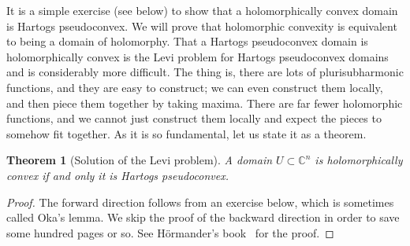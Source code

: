\documentclass[12pt,openany]{book}
\newcommand{\C}{{\mathbb{C}}}
\theoremstyle{plain}
\newtheorem{thm}{Theorem}[section]
\theoremstyle{remark}
\theoremstyle{definition}
\theoremstyle{exercise}
\theoremstyle{example}
\begin{document}
It is a simple exercise (see below) to show that a holomorphically convex
domain is Hartogs pseudoconvex.  We will prove that holomorphic convexity is
equivalent to being a domain of holomorphy.  That a Hartogs pseudoconvex
domain is holomorphically convex is the
Levi problem
for Hartogs pseudoconvex domains and is considerably more
difficult.  The thing is, there are lots of plurisubharmonic functions,
and they are easy to construct; we can even construct them locally, and then
piece them together by taking maxima.  There are far fewer holomorphic functions, and
we cannot just construct them locally and expect the pieces to somehow fit
together.  As it is so fundamental, let us state it as a theorem.

\begin{thm}[Solution of the Levi problem]
A domain $U \subset \C^n$ is holomorphically convex
if and only it is Hartogs pseudoconvex.
\end{thm}

\begin{proof}
The forward direction follows from an exercise below, which is sometimes
called Oka's lemma.
We skip the proof of the backward direction
in order to save some hundred pages or so.
See H\"ormander's book~\cite{Hormander} for the proof.
\end{proof}
\end{document}
